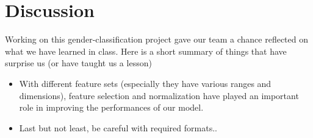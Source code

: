 \section{Discussion}
Working on this gender-classification project gave our team a chance reflected on what we have learned in class. Here is a short summary of things that have surprise us (or have taught us a lesson) 
\begin{itemize}
\item With different feature sets (especially they have various ranges and dimensions), feature selection and normalization have played an important role in improving the performances of our model. 
\item Last but not least, be careful with required formats..
\end{itemize} 
